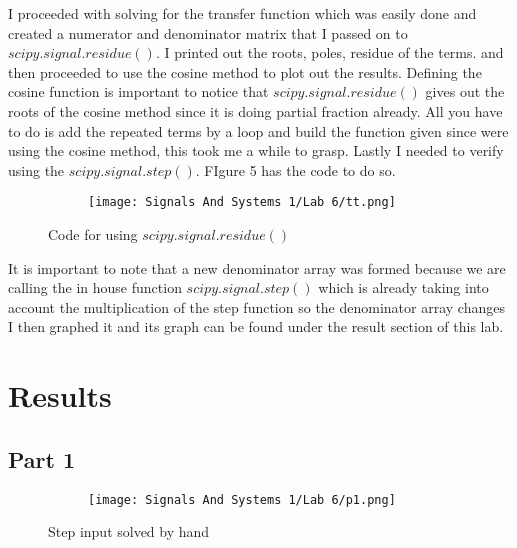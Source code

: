 \documentclass[12pt,a4paper]{article}
\begin{document}
I proceeded with solving for the transfer function which was easily done and created a numerator and denominator matrix that I passed on to $scipy.signal.residue()$. I printed out the roots, poles, residue of the terms. and then proceeded to use the cosine method to plot out the results.
Defining the cosine function is important to notice that $scipy.signal.residue()$ gives out the roots of the cosine method since it is doing partial fraction already. All you have to do is add the repeated terms by a loop and build the function given since were using the cosine method, this took me a while to grasp. Lastly I needed to verify using the $scipy.signal.step()$. FIgure 5 has the code to do so.


\clearpage


\begin{figure}[h]
\begin{subfigure}{ 1\textwidth}
\texttt{[image: Signals And Systems 1/Lab 6/tt.png]}
\end{subfigure}
\caption{Code for using $scipy.signal.residue()$}
\label{fig:image2}
\end{figure}
It is important to note that a new denominator array was formed because we are calling the in house function $scipy.signal.step()$ which is already taking into account the multiplication of the step function so the denominator array changes I then graphed it and its graph can be found under the result section of this lab.

















\section{Results}\label{sec:res}

\subsection{Part 1}

\begin{figure}[h]
\centering
\begin{subfigure}{ 1\textwidth}
\texttt{[image: Signals And Systems 1/Lab 6/p1.png]}
\end{subfigure}
\caption{ Step input solved by hand}
\label{fig2:image22}
\end{figure}
\end{document}

